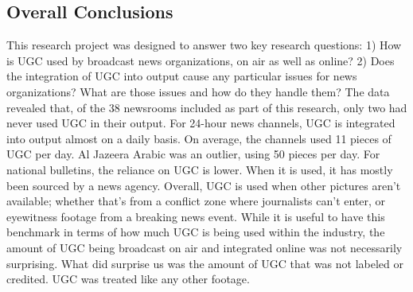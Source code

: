 \begin{enumerate}
\chapter{Overall Conclusions}
This research project was designed to answer two key research questions:
1) How is UGC used by broadcast news organizations, on air as
well as online?
2) Does the integration of UGC into output cause any particular
issues for news organizations? What are those issues and how do
they handle them?
The data revealed that, of the 38 newsrooms included as part of this research,
only two had never used UGC in their output. For 24-hour news channels,
UGC is integrated into output almost on a daily basis. On average, the channels
used 11 pieces of UGC per day. Al Jazeera Arabic was an outlier, using
50 pieces per day.
For national bulletins, the reliance on UGC is lower. When it is used, it has
mostly been sourced by a news agency. Overall, UGC is used when other
pictures aren't available; whether that's from a conflict zone where journalists
can't enter, or eyewitness footage from a breaking news event.
While it is useful to have this benchmark in terms of how much UGC is
being used within the industry, the amount of UGC being broadcast on air
and integrated online was not necessarily surprising. What did surprise us
was the amount of UGC that was not labeled or credited. UGC was treated
like any other footage.


\end{enumerate}
